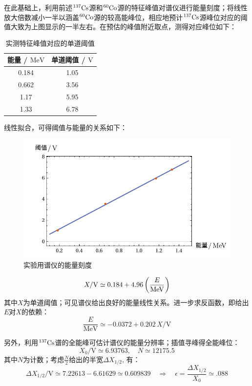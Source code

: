 \documentclass[aps,pre,12pt,preprint,%
	onecolumn,showpacs,showkeys,nofootinbib]{revtex4-1}
\newcommand{\naItl}{\tup{NaI\,(Tl)}}
\newcommand{\csAtom}{${}^{137}\mrm{Cs}$}
\newcommand{\coAtom}{${}^{60}\mrm{Co}$}
\begin{document}
	在此基础上，利用前述\csAtom 源和\coAtom 源的特征峰值对谱仪进行能量刻度；将线性放大倍数减小一半以涵盖\coAtom 源的较高能峰位，相应地预计\csAtom 源峰位对应的阈值大致为上图显示的一半左右。在预估的峰值附近取点，测得对应峰位如下：
	\begin{table}[!ht]
	\caption{实测特征峰值对应的单道阈值}\small
	\begin{tabularx}{.5\linewidth}{C{1}C{1}}
	\toprule\midrule
		能量 / $\si{\MeV}$ & 单道阈值 / $\si{\V}$ \\
	 & 1.05 \\
		0.662 & 3.56 \\
		1.17  & 5.95 \\
		1.33  & 6.78 \\
	\midrule\bottomrule
	\end{tabularx}
	\end{table}
\clearpage
	
	线性拟合，可得阈值与能量的关系如下：
	\begin{figure}[!ht]
	\centering
	\includegraphics[width=.8\linewidth]{img/plots/linearModel.pdf}
	\caption{实验用\naItl 谱仪的能量刻度}
	\end{figure}
	\vspace{-.6\baselineskip}
	\begin{equation}
		X/\si{\V} \simeq 0.184 + 4.96\,\pqty{\frac{E}{\si{\MeV}}}
	\end{equation}
	其中$X$为单道阈值；可见谱仪给出良好的能量线性关系。进一步求反函数，即给出$E$对$X$的依赖：
	\begin{equation}
		\frac{E}{\si{\MeV}} \simeq -0.0372 + 0.202\,X/\si{\V}
	\end{equation}
	
	另外，利用\csAtom 谱的全能峰可估计谱仪的能量分辨率；插值寻峰得全能峰位：
	\begin{equation}
		X_0/\si{\V} \simeq 6.93763,\quad N \simeq 12175.5
	\end{equation}
	其中$N$为计数；考虑$\frac{N}{2}$给出的半宽$\Delta X_{1/2}$, 有：
	\begin{equation}
		\Delta X_{1/2}/\si{\V} \simeq 7.22613 - 6.61629
		\simeq 0.609839
		\quad\Longrightarrow\quad
		\epsilon = \frac{\Delta X_{1/2}}{X_0} \simeq\num{.088}
	\end{equation}
	
\end{document}
